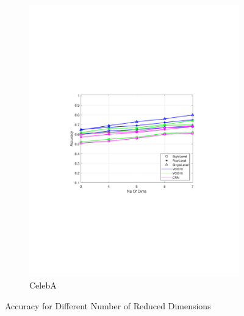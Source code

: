 \begin{figure}[ht!]
\begin{subfigure}{.33\textwidth}
		\includegraphics[width=\linewidth, trim=3.8cm 8cm 4cm 8cm, clip=true]{figures/celeba_acc}
		\captionsetup{justification=centering}
		\caption{CelebA}
		\label{fig:celeba_acc}
	\end{subfigure}
	\caption{Accuracy for Different Number of Reduced Dimensions }
	\label{fig:acc}
\end{figure}


